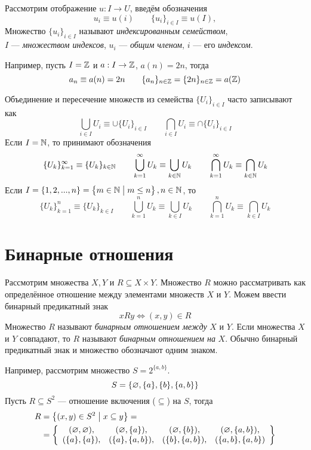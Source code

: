 Рассмотрим отображение $u:I\to U$, введём обозначения
\[
  u_{i}\equiv u(i)\qquad \{u_{i}\}_{i\in I}\equiv u(I),
\]
Множество $\{u_{i}\}_{i\in I}$ называют {\it индексированным семейством},\\
$I$ --- {\it множеством индексов}, $u_{i}$ --- {\it общим членом},
$i$ --- его {\it индексом}.

Например, пусть $I=\mathbb Z$ и $a:I\to \mathbb Z$, $a(n)=2n$, тогда
\[
  a_{n}\equiv a(n)=2n\qquad \{a_{n}\}_{n\in\mathbb Z}=\{2n\}_{n\in\mathbb Z}=a(\mathbb Z)
\]

Объединение и пересечение множеств из семейства $\{U_{i}\}_{i\in I}$
часто записывают как
\[
  \bigcup_{i\in I}U_{i}\equiv\cup \{U_{i}\}_{i\in I}\qquad
  \bigcap_{i\in I}U_{i}\equiv\cap \{U_{i}\}_{i\in I}
\]
Если $I=\mathbb N$, то принимают обозначения
\[
  \{U_{k}\}_{k=1}^{\infty}\equiv\{U_{k}\}_{k\in\mathbb N}\qquad
  \bigcup_{k=1}^{\infty}U_{k}\equiv\bigcup_{k\in\mathbb N}U_{k}\qquad
  \bigcap_{k=1}^{\infty}U_{k}\equiv\bigcap_{k\in\mathbb N}U_{k}
\]
Если $I=\{1,2,...,n\}=\left\{m\in\mathbb N\;\big|\;m\leq n\right\},n\in\mathbb N$, то
\[
  \{U_{k}\}_{k=1}^{n}\equiv\{U_{k}\}_{k\in I}\qquad
  \bigcup_{k=1}^{n}U_{k}\equiv\bigcup_{k\in I}U_{k}\qquad
  \bigcap_{k=1}^{n}U_{k}\equiv\bigcap_{k\in I}U_{k}
\]


\section{Бинарные отношения}

Рассмотрим множества $X,Y$ и $R\subseteq X\times Y$. Множество $R$ можно рассматривать
как определённое отношение между элементами множеств $X$ и $Y$. Можем ввести бинарный
предикатный знак
\[
  xRy\iff (x,y)\in R
\]
Множество $R$ называют {\it бинарным отношением между}
$X$ и $Y$. Если множества $X$ и $Y$
совпадают, то $R$ называют {\it бинарным отношением на} $X$.
Обычно бинарный предикатный знак и множество обозначают одним знаком.

Например, рассмотрим множество $S=2^{\{a,b\}}$.
\[
  S=\{\varnothing,\{a\},\{b\},\{a,b\}\}
\]
Пусть $R\subseteq S^{2}$ --- отношение включения ($\subseteq$) на $S$, тогда
\[
  \begin{aligned}
    R
     & =\left\{(x,y)\in S^{2}\;\big|\; x\subseteq y\right\}= \\
     & =\left\{
    \begin{array}{cccc}
      (\varnothing,\varnothing), & (\varnothing,\{a\}),   & (\varnothing,\{b\}),   & (\varnothing,\{a,b\}),  \\
      (\{a\},\{a\}), & (\{a\},\{a,b\}), & (\{b\},\{a,b\}), & (\{a,b\},\{a,b\})
    \end{array}\right\}
  \end{aligned}
\]

